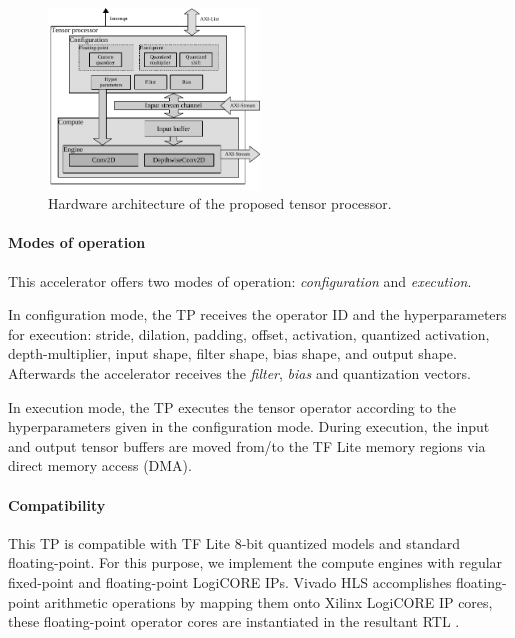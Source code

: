 \begin{figure}[t!]
	\centering
	\includegraphics[width=0.5\textwidth]{../figures/accelerator.pdf}
	\caption{Hardware architecture of the proposed tensor processor.}
	\label{fig:accelerator}
\end{figure}

\paragraph{Modes of operation} This accelerator offers two modes of operation: \emph{configuration} and \emph{execution}.

In configuration mode, the TP receives the operator ID and the hyperparameters for execution: stride, dilation, padding, offset, activation, quantized activation, depth-multiplier, input shape, filter shape, bias shape, and output shape. Afterwards the accelerator receives the \emph{filter}, \emph{bias} and quantization vectors.

In execution mode, the TP executes the tensor operator according to the hyperparameters given in the configuration mode. During execution, the input and output tensor buffers are moved from/to the TF Lite memory regions via direct memory access (DMA).

\paragraph{Compatibility}

 This TP is compatible with TF Lite 8-bit quantized models and standard floating-point. For this purpose, we implement the compute engines with regular fixed-point and floating-point LogiCORE IPs.
 Vivado HLS accomplishes floating-point arithmetic operations by mapping
 them onto Xilinx LogiCORE IP cores, these floating-point operator cores are instantiated in the resultant RTL \cite{hrica2012floating}.
 
